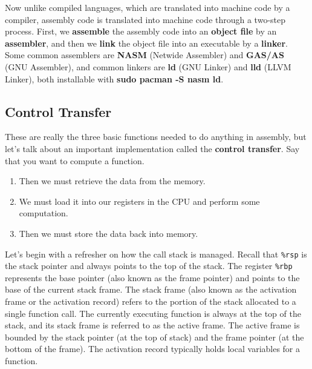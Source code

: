   Now unlike compiled languages, which are translated into machine code by a compiler, assembly code is translated into machine code through a two-step process. First, we \textbf{assemble} the assembly code into an \textbf{object file} by an \textbf{assembler}, and then we \textbf{link} the object file into an executable by a \textbf{linker}. Some common assemblers are \textbf{NASM} (Netwide Assembler) and \textbf{GAS/AS} (GNU Assembler), and common linkers are \textbf{ld} (GNU Linker) and \textbf{lld} (LLVM Linker), both installable with \textbf{sudo pacman -S nasm ld}. 

\subsection{Control Transfer}

  These are really the three basic functions needed to do anything in assembly, but let's talk about an important implementation called the \textbf{control transfer}. Say that you want to compute a function. 
  \begin{enumerate}
    \item Then we must retrieve the data from the memory. 
    \item We must load it into our registers in the CPU and perform some computation. 
    \item Then we must store the data back into memory. 
  \end{enumerate}

  Let’s begin with a refresher on how the call stack is managed. Recall that \texttt{\%rsp} is the stack pointer and always points to the top of the stack. The register \texttt{\%rbp} represents the base pointer (also known as the frame pointer) and points to the base of the current stack frame. The stack frame (also known as the activation frame or the activation record) refers to the portion of the stack allocated to a single function call. The currently executing function is always at the top of the stack, and its stack frame is referred to as the active frame. The active frame is bounded by the stack pointer (at the top of stack) and the frame pointer (at the bottom of the frame). The activation record typically holds local variables for a function.

